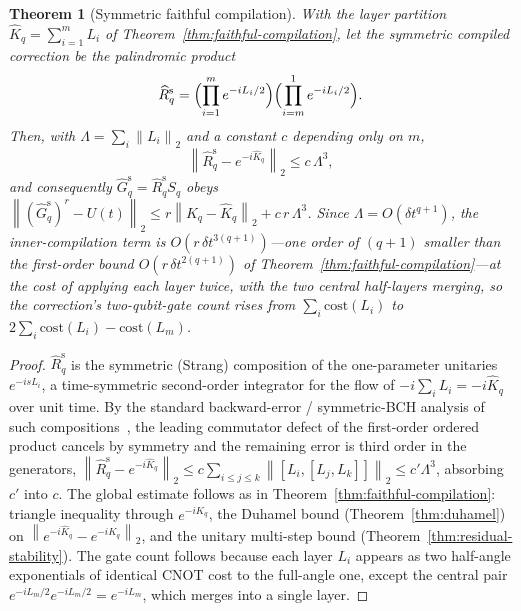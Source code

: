 \documentclass[aps,prxquantum,reprint,superscriptaddress,nofootinbib,amsmath,amssymb]{revtex4-2}
\newcommand{\norm}[1]{\left\lVert #1 \right\rVert}
\newcommand{\dt}{\delta t}
\newtheorem{theorem}{Theorem}
\begin{document}
\begin{theorem}[Symmetric faithful compilation]
\label{thm:symmetric-compilation}
With the layer partition $\widehat K_q=\sum_{i=1}^{m}L_i$ of Theorem~\ref{thm:faithful-compilation}, let the \emph{symmetric} compiled correction be the palindromic product
\begin{equation}
    \widehat R_q^{\mathrm{s}}=\Bigl(\prod_{i=1}^{m}e^{-iL_i/2}\Bigr)\Bigl(\prod_{i=m}^{1}e^{-iL_i/2}\Bigr).
\end{equation}
Then, with $\Lambda=\sum_i\norm{L_i}_2$ and a constant $c$ depending only on $m$,
\begin{equation}
    \norm{\widehat R_q^{\mathrm{s}}-e^{-i\widehat K_q}}_2\leq c\,\Lambda^3 ,
\end{equation}
and consequently $\widehat G_q^{\mathrm{s}}=\widehat R_q^{\mathrm{s}}S_q$ obeys $\norm{(\widehat G_q^{\mathrm{s}})^{r}-U(t)}_2\leq r\norm{K_q-\widehat K_q}_2+c\,r\,\Lambda^3$. Since $\Lambda=O(\dt^{q+1})$, the inner-compilation term is $O(r\,\dt^{3(q+1)})$---one order of $(q+1)$ smaller than the first-order bound $O(r\,\dt^{2(q+1)})$ of Theorem~\ref{thm:faithful-compilation}---at the cost of applying each layer twice, with the two central half-layers merging, so the correction's two-qubit-gate count rises from $\sum_i\mathrm{cost}(L_i)$ to $2\sum_i\mathrm{cost}(L_i)-\mathrm{cost}(L_m)$.
\end{theorem}

\begin{proof}
$\widehat R_q^{\mathrm{s}}$ is the symmetric (Strang) composition of the one-parameter unitaries $e^{-isL_i}$, a time-symmetric second-order integrator for the flow of $-i\sum_iL_i=-i\widehat K_q$ over unit time. By the standard backward-error / symmetric-BCH analysis of such compositions~\cite{blanes2009}, the leading commutator defect of the first-order ordered product cancels by symmetry and the remaining error is third order in the generators, $\norm{\widehat R_q^{\mathrm{s}}-e^{-i\widehat K_q}}_2\leq c\sum_{i\leq j\leq k}\norm{[L_i,[L_j,L_k]]}_2\leq c'\Lambda^3$, absorbing $c'$ into $c$. The global estimate follows as in Theorem~\ref{thm:faithful-compilation}: triangle inequality through $e^{-i\widehat K_q}$, the Duhamel bound (Theorem~\ref{thm:duhamel}) on $\norm{e^{-i\widehat K_q}-e^{-iK_q}}_2$, and the unitary multi-step bound (Theorem~\ref{thm:residual-stability}). The gate count follows because each layer $L_i$ appears as two half-angle exponentials of identical CNOT cost to the full-angle one, except the central pair $e^{-iL_m/2}e^{-iL_m/2}=e^{-iL_m}$, which merges into a single layer.
\end{proof}
\end{document}
